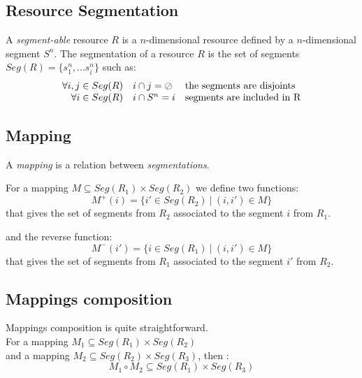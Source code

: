 \documentclass[twoside,10pt]{article}
\newcommand{\emptytseg}		{\ensuremath{\oslash}}
\newcommand{\seg}[1]			{Seg(#1)}
\begin{document}

\subsection{Resource Segmentation}\label{subsec:resourceseg}

A \emph{segment-able} resource $R$ is a $n$-dimensional resource defined by a $n$-dimensional segment $S^n$.
The segmentation of a resource $R$ is the set of segments
$\seg{R}=\{ s_1^n, ... s_i^n\}$ such as: \\
\begin{displaymath}
\begin{array}{rll}
\forall i, j \in \seg{R} & i \cap j =  \emptytseg  & $the segments are disjoints$ \\
\forall i \in \seg{R} & i \cap S^n = i & $segments are included in R$ \\
\end{array}
\end{displaymath}


\subsection{Mapping}\label{subsec:mapping}

A \emph{mapping} is a relation between \emph{segmentations}.

For a mapping $M\subseteq \seg{R_{1}}\times \seg{R_{2}}$ we define two functions:
\begin{equation}
M^{+}(i)=\{ i'\in \seg{R_{2}}\ |\ (i,i')\in M\}
\end{equation}
that gives the set of segments from $R_{2}$ associated to the segment
$i$ from $R_{1}$. 

and the reverse function:
\begin{equation}
M^{-}(i')=\{ i \in \seg{R_{1}}\ |\ (i,i')\in M\}
\end{equation}
that gives the set of segments from $R_{1}$ associated to the segment $i'$ from $R_{2}$.


\subsection{Mappings composition}\label{subsec:compmap}
Mappings composition is quite straightforward.\\
For a mapping $M_{1}\subseteq \seg{R_{1}}\times \seg{R_{2}}$ \\
and a mapping $M_{2}\subseteq \seg{R_{2}}\times \seg{R_{3}}$, then :
\[ M_{1} \circ M_{2} \subseteq \seg{R_{1}}\times \seg{R_{3}} \]
\end{document}
